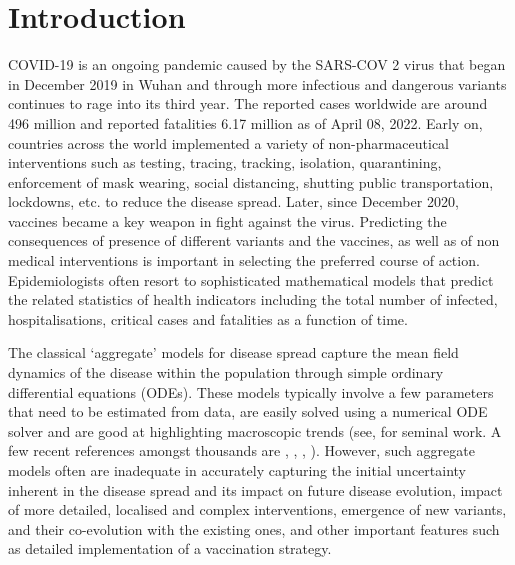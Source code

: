 \documentclass{article}
\theoremstyle{definition}
\begin{document}
\section{Introduction} 
  \label{Introduction}
COVID-19 is an ongoing pandemic caused by the SARS-COV 2 virus that began in December 2019 in Wuhan and through more infectious and dangerous variants continues to rage into its third year.  The reported cases worldwide are around 496 million and reported fatalities 6.17 million as of April 08, 2022. 
Early on, countries across the world
implemented a variety of non-pharmaceutical interventions such as testing, tracing, tracking, isolation, quarantining, enforcement of mask wearing, social distancing,
shutting public transportation, lockdowns, etc. to reduce the disease spread.
Later, since December 2020, vaccines became a key weapon in fight against the virus.
Predicting the consequences of presence of different  
variants and the vaccines, as well as of non medical interventions is important
  in selecting the preferred course of action.  Epidemiologists often resort to sophisticated mathematical
 models that predict the related statistics of health indicators including
 the total number of infected,
 hospitalisations, critical cases
  and fatalities as a function of time. 
  
  The classical `aggregate'  models for disease spread 
  capture the mean field dynamics of the disease within the population
  through simple ordinary differential equations (ODEs). 
  These models  typically involve a few parameters that need to be estimated from data, 
 are easily solved using a numerical ODE solver 
 and are good at highlighting macroscopic trends
 (see, \cite{kermack1927contribution} for seminal work.
 A few recent references amongst thousands are \cite{SIR1}, \cite{SIR3}, \cite{SIR4}, \cite{SIR5}).
 However, such aggregate models often 
 are inadequate in accurately capturing the initial uncertainty inherent in the  disease spread and its impact on future disease evolution, 
 impact of more detailed, localised
 and complex interventions,
 emergence of new variants, and their co-evolution
 with the existing ones,  and other important features such as detailed implementation of a vaccination strategy. 
  
  \bigskip
    
\end{document}

